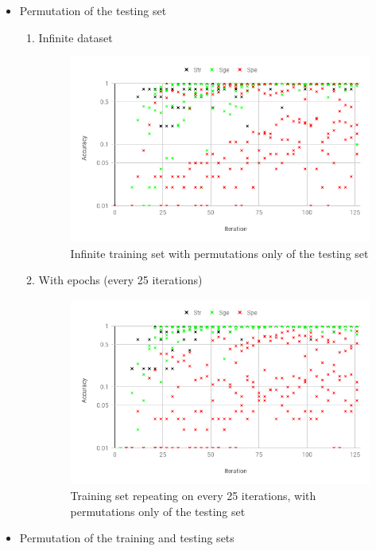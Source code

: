 \begin{itemize}
  
    \item {Permutation of the testing set}
    
    \begin{enumerate}[label=(\Alph*)]

        \item Infinite dataset
        
        \begin{figure}[!htb]
            \centering
            \includegraphics[width=.45\linewidth]{fig/content/results/shortest_path/base_ACC.png}
            \caption{Infinite training set with permutations only of the testing set}
            \label{fig:shotest_paths_base_ACC_results}
        \end{figure}
        
        \item With epochs (every 25 iterations)
        
        \begin{figure}[H]
            \centering
            \includegraphics[width=.45\linewidth]{fig/content/results/shortest_path/epochs_base_ACC.png}
            \caption{Training set repeating on every 25 iterations, with permutations only of the testing set}
            \label{fig:shotest_paths_base_epochs_ACC_results}
        \end{figure}

    \end{enumerate}
    
    \item {Permutation of the training and testing sets}

    \begin{enumerate}[label=(\Alph*)]


\end{enumerate}
\end{itemize}
